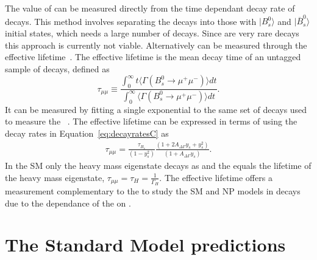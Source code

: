 The value of \ADG can be measured directly from the time dependant decay rate of \bsmumu decays. This method involves separating the \bsmumu decays into those with $| B^0_s \rangle$ and $|\overline{B}^0_s\rangle$ initial states, which needs a large number of \bsmumu decays. Since \bsmumu are very rare decays this approach is currently not viable. Alternatively \ADG can be measured through the \bsmumu effective lifetime~\cite{DeBruyn:2012wj}. The effective lifetime is the mean decay time of an untagged sample of \bsmumu decays, defined as~\cite{Fleischer:2011cw}
\begin{equation}
  \tau_{\mu\mu} \equiv \frac{\int^{\infty}_0 t\langle \Gamma (B^0_s \to \mu^+ \mu^-) \rangle dt}{\int^{\infty}_0 \langle \Gamma (B^0_s \to\mu^+ \mu^-) \rangle dt}.
\label{eq:EL_def}
\end{equation}
It can be measured by fitting a single exponential to the same set of decays used to measure the \BF~\cite{DeBruyn:2012wj}. The effective lifetime can be expressed in terms of \ADG using the decay rates in Equation~\ref{eq:decayratesC} as
\begin{align}
\tau_{\mu\mu} %
= \frac{\tau_{B_{s}}}{(1 - y_{s}^{2})} \frac{( 1 + 2A_{\Delta\Gamma}y_{s} + y_{s}^{2})}{(1 + A_{\Delta\Gamma}y_{s})}.
\label{eq:lifetimedef}
\end{align}
In the SM only the heavy \bs mass eigenstate decays as \bsmumu and the \el equals the lifetime of the heavy mass eigenstate, $\tau_{\mu\mu} = \tau_H = \frac{1}{\Gamma_H}$. The effective lifetime offers a measurement complementary to the \BFs to study the SM and NP models in \bsmumu decays due to the dependance of the \el on \ADG.

\section{The Standard Model predictions}
\label{sec:SM_predictions}

